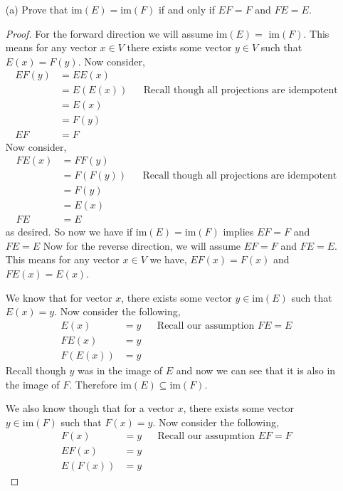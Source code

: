 \documentclass[12pt]{article}
\begin{document}
\begin{itemize}
\begin{itemize}
    \vspace{.3cm}
    \item[(a)]
    Prove that $\text{im}(E) = \text{im}(F)$ if and only if $EF = F$ and $FE = E$.
    \begin{proof}
        For the forward direction we will assume im$(E) =$ im$(F)$. This means for any vector $x\in V$ there exists some vector $y\in V$ such that $E(x) = F(y)$. 
        Now consider,
        \begin{align*}
            EF(y) &= EE(x) \\ 
            &= E(E(x)) && \text{Recall though all projections are idempotent} \\
            &= E(x) \\ 
            &= F(y) \\
            EF &= F
        \end{align*}
        Now consider,
        \begin{align*}
            FE(x) &= FF(y) \\
            &= F(F(y)) && \text{Recall though all projections are idempotent} \\
            &= F(y) \\
            &= E(x) \\
            FE &= E
        \end{align*}
        as desired. So now we have if im$(E) = \text{im}(F)$ implies $EF = F$ and $FE = E$
\newpage
        Now for the reverse direction, we will assume $EF = F$ and $FE = E$. This means for any vector $x\in V$ we have, $EF(x) = F(x)$ and $FE(x) = E(x)$. 

        We know that for vector $x$, there exists some vector $y\in \text{im}(E)$ such that $E(x) = y$. Now consider the following,
        \begin{align*}
            E(x) &= y && \text{Recall our assumption $FE = E$} \\
            FE(x) &= y \\
            F(E(x)) &= y 
        \end{align*}
        Recall though $y$ was in the image of $E$ and now we can see that it is also in the image of $F$. Therefore $\text{im}(E) \subseteq \text{im}(F)$.

        We also know though that for a vector $x$, there exists some vector $y \in \text{im}(F)$ such that $F(x) = y$. Now consider the following,
        \begin{align*}
            F(x) &= y && \text{Recall our assupmtion $EF = F$} \\
            EF(x) &= y \\
            E(F(x)) &= y
        \end{align*}


\end{proof}
\end{itemize}
\end{itemize}
\end{document}
